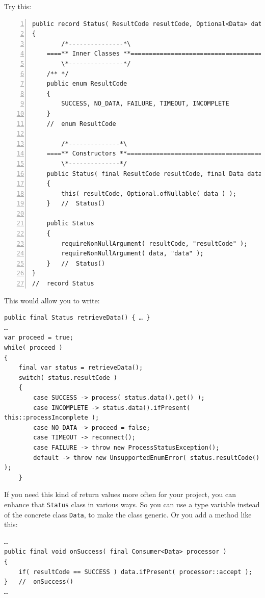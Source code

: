 \documentclass[11pt,a4paper, titlepage, parskip=half, headsepline, footsepline, cleardoublepage=current, headheight=1cm]{scrbook}
\begin{document}
Try this:
\begin{lstlisting}[numbers=left,caption={Status Record}]
public record Status( ResultCode resultCode, Optional<Data> data )
{
        /*---------------*\
    ====** Inner Classes **==========================================
        \*---------------*/
    /** */
    public enum ResultCode
    {
        SUCCESS, NO_DATA, FAILURE, TIMEOUT, INCOMPLETE
    }
    //  enum ResultCode
    
        /*--------------*\
    ====** Constructors **===========================================
        \*--------------*/
    public Status( final ResultCode resultCode, final Data data )
    {
        this( resultCode, Optional.ofNullable( data ) );
    }   //  Status()

    public Status
    {
        requireNonNullArgument( resultCode, "resultCode" );
        requireNonNullArgument( data, "data" );
    }   //  Status()
}
//  record Status
\end{lstlisting}

This would allow you to write:
\begin{lstlisting}
public final Status retrieveData() { … }
…
var proceed = true;
while( proceed )
{
    final var status = retrieveData();
    switch( status.resultCode )
    {
        case SUCCESS -> process( status.data().get() );
        case INCOMPLETE -> status.data().ifPresent( this::processIncomplete );
        case NO_DATA -> proceed = false;
        case TIMEOUT -> reconnect();
        case FAILURE -> throw new ProcessStatusException();
        default -> throw new UnsupportedEnumError( status.resultCode() );
    }
\end{lstlisting}

If you need this kind of return values more often for your project, you can enhance that \lstinline|Status| class in various ways. So you can use a type variable instead of the concrete class \lstinline|Data|, to make the class generic. Or you add a method like this:
\begin{lstlisting}
…
public final void onSuccess( final Consumer<Data> processor )
{
    if( resultCode == SUCCESS ) data.ifPresent( processor::accept );
}   //  onSuccess()
…
\end{lstlisting}

\end{document}
